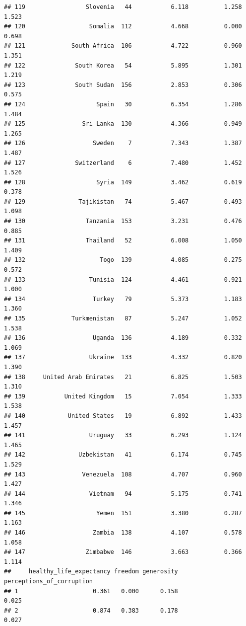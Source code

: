 \documentclass[]{article}
\begin{document}
\begin{verbatim}
## 119                 Slovenia   44           6.118          1.258          1.523
## 120                  Somalia  112           4.668          0.000          0.698
## 121             South Africa  106           4.722          0.960          1.351
## 122              South Korea   54           5.895          1.301          1.219
## 123              South Sudan  156           2.853          0.306          0.575
## 124                    Spain   30           6.354          1.286          1.484
## 125                Sri Lanka  130           4.366          0.949          1.265
## 126                   Sweden    7           7.343          1.387          1.487
## 127              Switzerland    6           7.480          1.452          1.526
## 128                    Syria  149           3.462          0.619          0.378
## 129               Tajikistan   74           5.467          0.493          1.098
## 130                 Tanzania  153           3.231          0.476          0.885
## 131                 Thailand   52           6.008          1.050          1.409
## 132                     Togo  139           4.085          0.275          0.572
## 133                  Tunisia  124           4.461          0.921          1.000
## 134                   Turkey   79           5.373          1.183          1.360
## 135             Turkmenistan   87           5.247          1.052          1.538
## 136                   Uganda  136           4.189          0.332          1.069
## 137                  Ukraine  133           4.332          0.820          1.390
## 138     United Arab Emirates   21           6.825          1.503          1.310
## 139           United Kingdom   15           7.054          1.333          1.538
## 140            United States   19           6.892          1.433          1.457
## 141                  Uruguay   33           6.293          1.124          1.465
## 142               Uzbekistan   41           6.174          0.745          1.529
## 143                Venezuela  108           4.707          0.960          1.427
## 144                  Vietnam   94           5.175          0.741          1.346
## 145                    Yemen  151           3.380          0.287          1.163
## 146                   Zambia  138           4.107          0.578          1.058
## 147                 Zimbabwe  146           3.663          0.366          1.114
##     healthy_life_expectancy freedom generosity perceptions_of_corruption
## 1                     0.361   0.000      0.158                     0.025
## 2                     0.874   0.383      0.178                     0.027

\end{verbatim}
\end{document}
